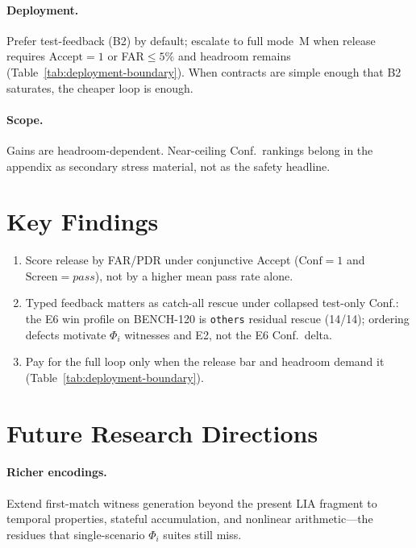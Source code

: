 \paragraph{Deployment.}
Prefer test-feedback (B2) by default; escalate to full mode~M when release
requires $\mathrm{Accept}{=}1$ or FAR${\le}5\%$ and headroom remains
(Table~\ref{tab:deployment-boundary}).
When contracts are simple enough that B2 saturates, the cheaper loop is enough.

\paragraph{Scope.}
Gains are headroom-dependent.
Near-ceiling Conf.\ rankings belong in the appendix as secondary stress
material, not as the safety headline.


\section{Key Findings}
\label{sec:conc:takeaways}
\label{sec:conc:remember}%

\begin{enumerate}
  \item Score release by FAR/PDR under conjunctive Accept
        ($\mathrm{Conf}{=}1$ and $\mathrm{Screen}{=}\mathit{pass}$), not by a
        higher mean pass rate alone.
  \item Typed feedback matters as catch-all rescue under collapsed test-only
        Conf.: the E6 win profile on BENCH-120 is \texttt{others} residual
        rescue (14/14); ordering defects motivate $\Phi_i$ witnesses and E2,
        not the E6 Conf.\ delta.
  \item Pay for the full loop only when the release bar and headroom demand
        it (Table~\ref{tab:deployment-boundary}).
\end{enumerate}


\section{Future Research Directions}
\label{sec:conc:future}

\paragraph{Richer encodings.}
Extend first-match witness generation beyond the present LIA fragment to
temporal properties, stateful accumulation, and nonlinear arithmetic---the
residues that single-scenario $\Phi_i$ suites still miss.

